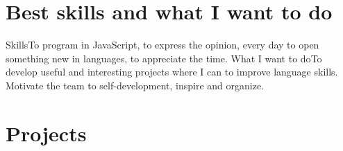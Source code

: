 \documentclass[11pt,a4paper]{moderncv}
\begin{document}
\maketitle
\section{Best skills and what I want to do}
  \cvline
    {Skills}{To program in JavaScript, to express the opinion, every day to open something new in languages, to appreciate the time.}
  \cvline
    {What I want to do}{To develop useful and interesting projects where I can to improve language skills. Motivate the team to self-development, inspire and organize.}

\section{Projects}
\end{document}
